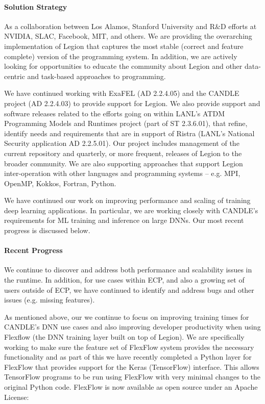 \paragraph{Solution Strategy}
As a collaboration between Los Alamos, Stanford University and R\&D
efforts at NVIDIA, SLAC, Facebook, MIT, and others.  We are providing
the overarching implementation of Legion that captures the most stable
(correct and feature complete) version of the programming system.  In
addition, we are actively looking for opportunities to educate the
community about Legion and other data-centric and task-based
approaches to programming.

We have continued working with ExaFEL (AD 2.2.4.05) and the CANDLE
project (AD 2.2.4.03) to provide support for Legion.  We also provide
support and software releases related to the efforts going on within
LANL's ATDM Programming Models and Runtimes project (part of ST
2.3.6.01), that refine, identify needs and requirements that are in
support of Ristra (LANL's National Security application AD 2.2.5.01).
Our project includes management of the current repository and
quarterly, or more frequent, releases of Legion to the broader
community.  We are also supporting approaches that support Legion
inter-operation with other languages and programming systems --
e.g. MPI, OpenMP, Kokkos, Fortran, Python.

We have continued our work on improving performance and scaling of
training deep learning applications.  In particular, we are working
closely with CANDLE's requirements for ML training and inference on
large DNNs. Our most recent progress is discussed below. 

\paragraph{Recent Progress}

We continue to discover and address both performance and scalability
issues in the runtime.  In addition, for use cases within ECP, and
also a growing set of users outside of ECP, we have continued to
identify and address bugs and other issues (e.g. missing features).

As mentioned above, our we continue to focus on improving training
times for CANDLE's DNN use cases and also improving developer productivity
when using Flexflow (the DNN training layer built on top of Legion).  
We are specifically working to make sure the feature set of FlexFlow system
provides the necessary functionality and as part of this we have recently
completed a Python layer for FlexFlow that provides support for the Keras
(TensorFlow) interface.  This allows TensorFlow programs to be run using
FlexFlow with very minimal changes to the original Python code.  FlexFlow
is now available as open source under an Apache License:

